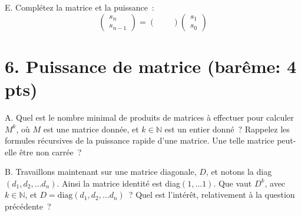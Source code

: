 \documentclass[11pt]{article}
\def\N{\mathbb N}
\begin{document}
   
\medskip
E. Complétez la matrice et la puissance~:
$$
\left( \begin{array}{c}
s_n \\
s_{n-1} \end{array} \right) = \left( \begin{array}{cc}
~ & ~ \\
~ & ~ \end{array} \right) \left( \begin{array}{c}
s_1 \\
s_0 \end{array} \right)
$$

\section*{6. Puissance de matrice (barême: 4 pts)}

A. Quel est le nombre minimal de produits de matrices à effectuer pour calculer $M^k$, où $M$ est une matrice donnée, et $k\in \N$ est un entier donné~?
Rappelez les formules récursives de la puissance rapide d'une matrice. Une telle matrice peut-elle être non carrée~?

\medskip
B. Travaillons maintenant sur une matrice diagonale, $D$, et
notons la diag$(d_1, d_2, \ldots d_n)$. Ainsi la matrice identité est 
diag$(1, \ldots 1)$. Que vaut $D^k$, avec $k\in \N$, et $D=\mbox{diag}(d_1, d_2, \ldots d_n)$~?
Quel est l'intérêt, relativement à la question précédente~?
\end{document}
